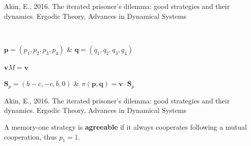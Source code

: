\documentclass{beamer}
\begin{document}
\begin{frame}
    \begin{center}
        \pause
        
    \end{center}
\end{frame}

\begin{frame}
    \centering
    Akin, E., 2016. The iterated prisoner's dilemma: good strategies and their dynamics. Ergodic Theory, Advances in Dynamical Systems

    \pause
    
\end{frame}

\begin{frame}
    \centering
    
\end{frame}

\begin{frame}
    \centering
     \\
    \vspace{1cm}

    \pause
    \(\mathbf{p} = (p_1, p_2, p_3, p_4)\) \& \(\mathbf{q} = (q_1, q_2, q_3, q_4)\) \\
    \vspace{.5cm}
    \pause

    \(\mathbf{v} M = \mathbf{v}\) \\
    \vspace{.5cm}
    \pause

    \(\mathbf{S}_{p} = (b-c, -c, b, 0)\) \& \(\pi(\mathbf{p}, \mathbf{q}) = \mathbf{v} \cdot \mathbf{S}_{p}\)
\end{frame}

\begin{frame}
    \centering
    Akin, E., 2016. The iterated prisoner's dilemma: good strategies and their dynamics. Ergodic Theory, Advances in Dynamical Systems
\end{frame}

\begin{frame}
    \footnotesize{
    \begin{definition}
        A memory-one strategy is \textbf{agreeable} if it always cooperates following a mutual cooperation,
        thus \(p_1=1\).
    \end{definition}}
\end{frame}
\end{document}
